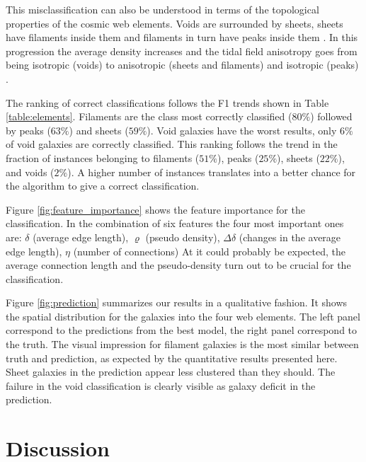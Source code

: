 \documentclass[usenatbib]{mnras}
\begin{document}
This misclassification can also be understood in terms of the topological properties of the cosmic web elements. 
Voids are surrounded by sheets, sheets have filaments inside them and
filaments in turn have peaks inside them \citep{Cautun2014}. 
In this progression the average density increases and the tidal field
anisotropy goes from being isotropic (voids) to anisotropic (sheets
and filaments) and isotropic (peaks) \citep{Bustamante2015}.

The ranking of correct classifications follows the F1 trends shown in Table \ref{table:elements}.
Filaments are the class most correctly classified ($80\%$) followed by
peaks ($63\%$) and sheets ($59\%$).
Void galaxies have the worst results, only $6\%$ of void galaxies are
correctly classified.
This ranking follows the trend in the fraction of instances belonging to
filaments ($51\%$), peaks ($25\%$), sheets ($22\%$), and voids ($2\%$).
A higher number of instances translates into a better chance for the
algorithm to give a correct classification. 

Figure \ref{fig:feature_importance} shows the feature
importance for the classification.
In the combination of six features the four most important ones are:
$\delta$ (average edge
length), $\varrho$ (pseudo density), $\Delta \delta$ (changes in the average edge length), $\eta$ (number of connections) 
At it could probably be expected, the average connection length and the pseudo-density turn out to be crucial for the classification.

Figure \ref{fig:prediction} summarizes our results in a qualitative fashion.
It shows the spatial distribution for the galaxies into the four web
elements. 
The left panel correspond to the predictions from the best model, the right panel correspond to the truth.
The visual impression for filament galaxies is the most
similar between truth and prediction, as expected by the quantitative
results presented here.
Sheet galaxies in the prediction appear less clustered
than they should.
The failure in the void classification is clearly visible as galaxy deficit in the prediction.



\section{Discussion}\label{sec:discussion}
\end{document}

